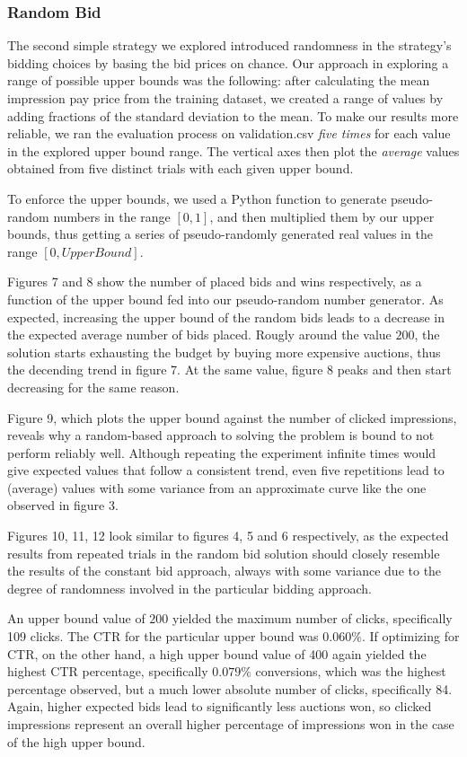 \documentclass{sig-alternate-05-2015}
\begin{document}
\subsubsection{Random Bid}

The second simple strategy we explored introduced randomness in the strategy's bidding choices by basing the bid prices on chance. Our approach in exploring a range of possible upper bounds was the following: after calculating the mean impression pay price from the training dataset, we created a range of values by adding fractions of the standard deviation to the mean. To make our results more reliable, we ran the evaluation process on validation.csv \textit{five times} for each value in the explored upper bound range. The vertical axes then plot the \textit{average} values obtained from five distinct trials with each given upper bound.

To enforce the upper bounds, we used a Python function to generate pseudo-random numbers in the range $[0,1]$, and then multiplied them by our upper bounds, thus getting a series of pseudo-randomly generated real values in the range $[0, UpperBound]$.

Figures 7 and 8 show the number of placed bids and wins respectively, as a function of the upper bound fed into our pseudo-random number generator. As expected, increasing the upper bound of the random bids leads to a decrease in the expected average number of bids placed. Rougly around the value $200$, the solution starts exhausting the budget by buying more expensive auctions, thus the decending trend in figure 7. At the same value, figure 8 peaks and then start decreasing for the same reason.

Figure 9, which plots the upper bound against the number of clicked impressions, reveals why a random-based approach to solving the problem is bound to not perform reliably well. Although repeating the experiment infinite times would give expected values that follow a consistent trend, even five repetitions lead to (average) values with some variance from an approximate curve like the one observed in figure 3.

Figures 10, 11, 12 look similar to figures 4, 5 and 6 respectively, as the expected results from repeated trials in the random bid solution should closely resemble the results of the constant bid approach, always with some variance due to the degree of randomness involved in the particular bidding approach.

An upper bound value of $200$ yielded the maximum number of clicks, specifically 109 clicks. The CTR for the particular upper bound was $0.060\%$. If optimizing for CTR, on the other hand, a high upper bound value of 400 again yielded the highest CTR percentage, specifically $0.079\%$ conversions, which was the highest percentage observed, but a much lower absolute number of clicks, specifically 84. Again, higher expected bids lead to significantly less auctions won, so clicked impressions represent an overall higher percentage of impressions won in the case of the high upper bound.
\end{document}
